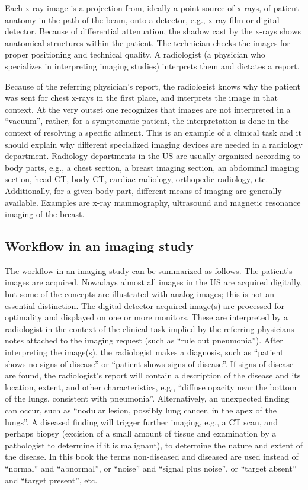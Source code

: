 \documentclass[
]{book}
\begin{document}
Each x-ray image is a projection from, ideally a point source of x-rays, of patient anatomy in the path of the beam, onto a detector, e.g., x-ray film or digital detector. Because of differential attenuation, the shadow cast by the x-rays shows anatomical structures within the patient. The technician checks the images for proper positioning and technical quality. A radiologist (a physician who specializes in interpreting imaging studies) interprets them and dictates a report.

Because of the referring physician's report, the radiologist knows why the patient was sent for chest x-rays in the first place, and interprets the image in that context. At the very outset one recognizes that images are not interpreted in a ``vacuum'', rather, for a symptomatic patient, the interpretation is done in the context of resolving a specific ailment. This is an example of a clinical task and it should explain why different specialized imaging devices are needed in a radiology department. Radiology departments in the US are usually organized according to body parts, e.g., a chest section, a breast imaging section, an abdominal imaging section, head CT, body CT, cardiac radiology, orthopedic radiology, etc. Additionally, for a given body part, different means of imaging are generally available. Examples are x-ray mammography, ultrasound and magnetic resonance imaging of the breast.

\hypertarget{workflow-in-an-imaging-study}{%
\subsection{Workflow in an imaging study}\label{workflow-in-an-imaging-study}}

The workflow in an imaging study can be summarized as follows. The patient's images are acquired. Nowadays almost all images in the US are acquired digitally, but some of the concepts are illustrated with analog images; this is not an essential distinction. The digital detector acquired image(s) are processed for optimality and displayed on one or more monitors. These are interpreted by a radiologist in the context of the clinical task implied by the referring physicians notes attached to the imaging request (such as ``rule out pneumonia''). After interpreting the image(s), the radiologist makes a diagnosis, such as ``patient shows no signs of disease'' or ``patient shows signs of disease''. If signs of disease are found, the radiologist's report will contain a description of the disease and its location, extent, and other characteristics, e.g., ``diffuse opacity near the bottom of the lungs, consistent with pneumonia''. Alternatively, an unexpected finding can occur, such as ``nodular lesion, possibly lung cancer, in the apex of the lungs''. A diseased finding will trigger further imaging, e.g., a CT scan, and perhaps biopsy (excision of a small amount of tissue and examination by a pathologist to determine if it is malignant), to determine the nature and extent of the disease. In this book the terms non-diseased and diseased are used instead of ``normal'' and ``abnormal'', or ``noise'' and ``signal plus noise'', or ``target absent'' and ``target present'', etc.
\end{document}
